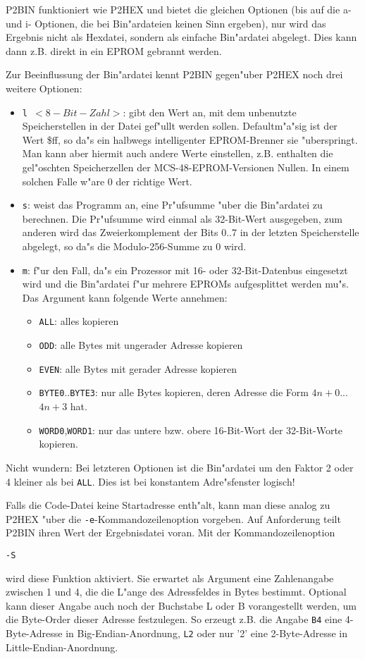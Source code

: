\documentclass[12pt,a4paper,twoside]{report}
\newcommand{\tty}[1]{{\tt #1}}
\begin{document}
P2BIN funktioniert wie P2HEX und bietet die gleichen Optionen (bis
auf die a- und i- Optionen, die bei Bin"ardateien keinen Sinn ergeben), nur
wird das Ergebnis nicht als Hexdatei, sondern als einfache Bin"ardatei
abgelegt.  Dies kann dann z.B. direkt in ein EPROM gebrannt werden.
\par
Zur Beeinflussung der Bin"ardatei kennt P2BIN gegen"uber P2HEX noch
drei weitere Optionen:
\begin{itemize}
\item{\tty{l $<8-Bit-Zahl>$}: gibt den Wert an, mit dem unbenutzte
      Speicherstellen in der Datei gef"ullt werden sollen.
      Defaultm"a"sig ist der Wert \$ff, so da"s ein halbwegs
      intelligenter EPROM-Brenner sie "uberspringt.  Man kann aber
      hiermit auch andere Werte einstellen, z.B. enthalten die gel"oschten
      Speicherzellen der MCS-48-EPROM-Versionen Nullen.  In einem solchen
      Falle w"are 0 der richtige Wert.}
\item{\tty{s}: weist das Programm an, eine Pr"ufsumme "uber die Bin"ardatei zu
      berechnen.  Die Pr"ufsumme wird einmal als 32-Bit-Wert ausgegeben,
      zum anderen wird das Zweierkomplement der Bits 0..7 in der letzten
      Speicherstelle abgelegt, so da"s die Modulo-256-Summe zu 0 wird.}
\item{\tty{m}:  f"ur den Fall, da"s ein Prozessor mit 16- oder 32-Bit-Datenbus
      eingesetzt wird und die Bin"ardatei f"ur mehrere EPROMs aufgesplittet
      werden mu"s.  Das Argument kann folgende Werte annehmen:
      \begin{itemize}
      \item{\tty{ALL}: alles kopieren}
      \item{\tty{ODD}: alle Bytes mit ungerader Adresse kopieren}
      \item{\tty{EVEN}: alle Bytes mit gerader Adresse kopieren}
      \item{\tty{BYTE0}..\tty{BYTE3}: nur alle Bytes kopieren, deren Adresse die Form
            $4n+0$...$4n+3$ hat.}
      \item{\tty{WORD0},\tty{WORD1}: nur das untere bzw. obere 16-Bit-Wort der
            32-Bit-Worte kopieren.}
      \end{itemize}}
\end{itemize}

Nicht wundern: Bei letzteren Optionen ist die Bin"ardatei um den Faktor 2
oder 4 kleiner als bei \tty{ALL}.  Dies ist bei konstantem Adre"sfenster logisch!

Falls die Code-Datei keine Startadresse enth"alt, kann man diese
analog zu P2HEX "uber die \tty{-e}-Kommandozeilenoption vorgeben.  Auf
Anforderung teilt P2BIN ihren Wert der Ergebnisdatei voran.  Mit der
Kommandozeilenoption
\begin{verbatim}
-S
\end{verbatim}
wird diese Funktion aktiviert.  Sie erwartet als Argument eine
Zahlenangabe zwischen 1 und 4,  die die L"ange des Adressfeldes in
Bytes bestimmt.  Optional kann dieser Angabe auch noch der Buchstabe
L oder B vorangestellt werden, um die Byte-Order dieser Adresse
festzulegen.  So erzeugt z.B. die Angabe \tty{B4} eine 4-Byte-Adresse in
Big-Endian-Anordnung, \tty{L2} oder nur '2' eine 2-Byte-Adresse in
Little-Endian-Anordnung.
\end{document}
